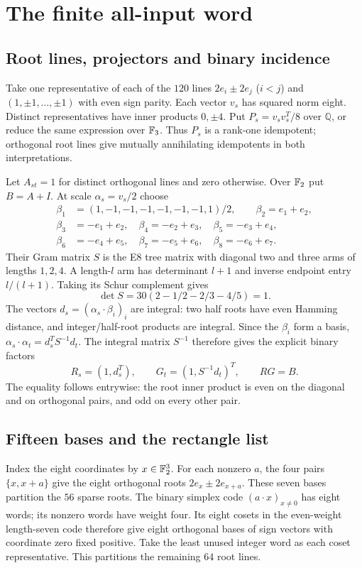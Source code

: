 \section{The finite all-input word}
\label{app:finite-unit}

\subsection{Root lines, projectors and binary incidence}
Take one representative of each of the $120$ lines
$2e_i\pm2e_j$ ($i<j$) and $(1,\pm1,\ldots,\pm1)$ with even
sign parity. Each vector $v_s$ has squared norm eight. Distinct
representatives have inner products $0,\pm4$. Put
$P_s=v_sv_s^T/8$ over $\mathbb Q$, or reduce the same expression over
$\mathbb F_3$. Thus $P_s$ is a rank-one idempotent; orthogonal root lines
give mutually annihilating idempotents in both interpretations.

Let $A_{st}=1$ for distinct orthogonal lines and zero otherwise.
Over $\mathbb F_2$ put $B=A+I$. At scale $\alpha_s=v_s/2$ choose
\[
\begin{split}
\beta_1&=(1,-1,-1,-1,-1,-1,-1,1)/2,\qquad\beta_2=e_1+e_2,\\
\beta_3&=-e_1+e_2,\quad\beta_4=-e_2+e_3,\quad
\beta_5=-e_3+e_4,\\
\beta_6&=-e_4+e_5,\quad\beta_7=-e_5+e_6,\quad
\beta_8=-e_6+e_7.
\end{split}
\]
Their Gram matrix $S$ is the E8 tree matrix with diagonal two and
three arms of lengths $1,2,4$. A length-$l$ arm has determinant
$l+1$ and inverse endpoint entry $l/(l+1)$. Taking its Schur
complement gives
\[
 \det S=30(2-1/2-2/3-4/5)=1.
\]
The vectors $d_s=(\alpha_s\cdot\beta_i)_i$ are integral: two half
roots have even Hamming distance, and integer/half-root products are
integral. Since the $\beta_i$ form a basis,
$\alpha_s\cdot\alpha_t=d_s^TS^{-1}d_t$. The integral matrix
$S^{-1}$ therefore gives the explicit binary factors
\[
 R_s=(1,d_s^T),\qquad G_t=(1,S^{-1}d_t)^T,\qquad RG=B.
\]
The equality follows entrywise: the root inner product is even on
the diagonal and on orthogonal pairs, and odd on every other pair.

\subsection{Fifteen bases and the rectangle list}
Index the eight coordinates by $x\in\mathbb F_2^3$. For each nonzero $a$,
the four pairs $\{x,x+a\}$ give the eight orthogonal roots
$2e_x\pm2e_{x+a}$. These seven bases partition the $56$ sparse roots.
The binary simplex code $(a\cdot x)_{x\ne0}$ has eight words; its
nonzero words have weight four. Its eight cosets in the even-weight
length-seven code therefore give eight orthogonal bases of sign
vectors with coordinate zero fixed positive. Take the least unused
integer word as each coset representative. This partitions the
remaining $64$ root lines.

